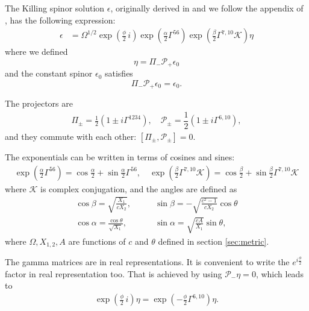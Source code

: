 
The Killing spinor solution $\epsilon$, originally derived in \cite{Pilch:2003jg} and we follow the appendix of \cite{Chen-Lin:2015xlh}, has the following expression:
\begin{align}
\epsilon &= \Omega^{1/2} \exp{\left(\frac{\phi}{2}\, i \right)} \exp{\left(\frac{\alpha}{2}\Gamma^{56} \right)} \exp{\left(\frac{\beta}{2}\Gamma^{7, 10} \mathcal{K} \right)} \eta
\end{align}
where we defined
\begin{equation}
\eta = \Pi_{-} \mathcal{P}_+ \epsilon_0
\end{equation}
and the constant spinor $\epsilon_0$ satisfies
\begin{equation}
 \Pi_- \mathcal{P}_+ \epsilon_0 = \epsilon_0.
\end{equation}

The projectors are
\begin{align}
\Pi_\pm = 
\frac{1}{2}\left(1 \pm i\Gamma^{1234}\right), 
\quad
\mathcal{P}_{\pm} =
\dfrac{1}{2} \left(1\pm i\Gamma^{6,10}\right),
\end{align}
and they commute with each other: $[\Pi_\pm, \mathcal{P}_{\pm}]=0$.

The exponentials can be written in terms of cosines and sines:
\begin{align}
\exp{\left(\frac{\alpha}{2}\Gamma^{56} \right)} = \cos\frac{\alpha}{2} + \sin\frac{\alpha}{2}\Gamma^{5 6},
\quad
\exp{\left(\frac{\beta}{2}\Gamma^{7, 10} \mathcal{K} \right)} = \cos\frac{\beta}{2} + \sin\frac{\beta}{2}\Gamma^{7, 10}\mathcal{K}
\end{align}
where $\mathcal{K}$ is complex conjugation, and the angles are defined as
\begin{align}
\cos\beta = \sqrt{\frac{X_1}{c X_2}}, \quad 
&\quad
\sin\beta = -\sqrt{\frac{c^2 - 1}{c X_2}}\cos\theta\\
%
\cos\alpha = \frac{\cos\theta}{\sqrt{X_1}}, 
&\quad
\sin\alpha = \sqrt{\frac{c A}{X_1}}\sin\theta,
\end{align}
where $\Omega, X_{1,2}, A$ are functions of $c$ and $\theta$ defined in section \ref{sec:metric}.


The gamma matrices are in real representations. It is convenient to write the $e^{i \frac{\phi}{2}}$ factor in real representation too. 
That is achieved by using $\mathcal{P}_- \eta = 0 $, which leads to
\begin{align}
 \exp{\left(\frac{\phi}{2}\, i \right)} \eta 
    = \exp{\left(-\frac{\phi}{2}\Gamma^{6, 10} \right)} \eta. 
\end{align}


